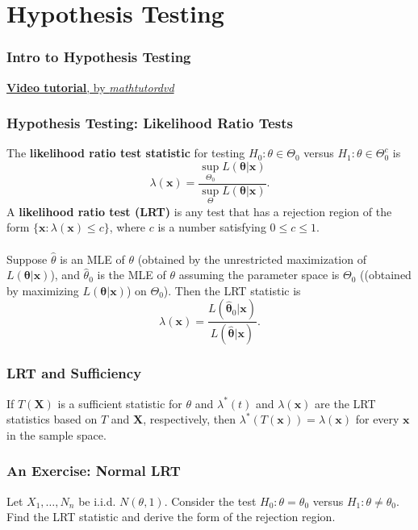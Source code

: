 \documentclass{beamer}
\begin{document}

\section{Hypothesis Testing}

\begin{frame}
\frametitle{Intro to Hypothesis Testing}
\href{https://youtu.be/VK-rnA3-41c}{\textbf{Video tutorial}, by \textit{mathtutordvd}}
\end{frame}


\begin{frame}
\frametitle{Hypothesis Testing: Likelihood Ratio Tests}
The \textbf{likelihood ratio test statistic} for testing $H_0: \theta \in \Theta_0$ versus $H_1: \theta \in \Theta_0^{c}$ is
$$
\lambda(\mathbf{x}) = \frac{\sup_{\Theta_0} L(\mathbf{\theta}|\mathbf{x})}{\sup_{\Theta} L(\mathbf{\theta}|\mathbf{x})}.
$$
A \textbf{likelihood ratio test (LRT)} is any test that has a rejection region of the form $\{\mathbf{x}: \lambda(\mathbf{x})\leq c\}$, where $c$ is a number satisfying $0\leq c\leq 1$.
\\~\\
Suppose $\hat{\theta}$ is an MLE of $\theta$ (obtained by the unrestricted maximization of $L(\mathbf{\theta}|\mathbf{x})$), and $\hat{\theta}_0$ is the MLE of $\theta$ assuming the parameter space is $\Theta_0$ ((obtained by maximizing $L(\mathbf{\theta}|\mathbf{x})$) on $\Theta_0$). Then the LRT statistic is
$$
\lambda(\mathbf{x}) = \frac{L(\mathbf{\hat\theta}_0|\mathbf{x})}{L(\mathbf{\hat\theta}|\mathbf{x})}.
$$
\end{frame}

\begin{frame}
\frametitle{LRT and Sufficiency}
\begin{theorem}
If $T(\mathbf{X})$ is a sufficient statistic for $\theta$ and $\lambda^*(t)$ and $\lambda(\mathbf{x})$ are the LRT statistics based on $T$ and $\mathbf{X}$, respectively, then $\lambda^*(T(\mathbf{x}))=\lambda(\mathbf{x})$ for every $\mathbf{x}$ in the sample space.
\end{theorem}
\end{frame}

\begin{frame}
\frametitle{An Exercise: Normal LRT}
Let $X_1,\ldots,N_n$ be i.i.d. $N(\theta,1)$. Consider the test $H_0: \theta=\theta_0$ versus $H_1: \theta \neq \theta_0$. Find the LRT statistic and derive the form of the rejection region.
\\~\\
\end{frame}
\end{document}
